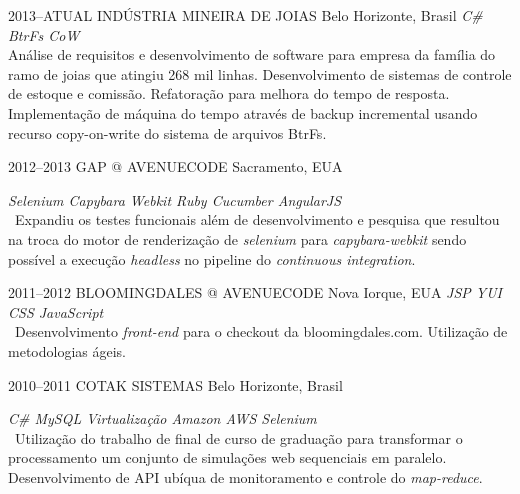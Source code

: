 \documentclass[]{friggeri-cv}
\begin{document}
\begin{entrylist}


\entry
{2013--ATUAL}
{INDÚSTRIA MINEIRA DE JOIAS}
{Belo Horizonte, Brasil}
{\emph{\bullet C\# \bullet BtrFs CoW  } \\ Análise de requisitos e desenvolvimento de software para empresa da família do ramo de joias que atingiu 268 mil linhas. Desenvolvimento de sistemas de controle de estoque e comissão. Refatoração para melhora do tempo de resposta. Implementação de máquina do tempo através de backup incremental usando recurso copy-on-write do sistema de arquivos BtrFs. }


\entry
{2012--2013}
{GAP @ AVENUECODE}
{Sacramento, EUA}
{\emph{\bullet Selenium \bullet Capybara \bullet Webkit \bullet Ruby \bullet Cucumber \bullet AngularJS } \\
\
Expandiu os testes funcionais além de desenvolvimento e pesquisa que resultou na troca do motor de renderização de \textit{selenium} para \textit{capybara-webkit} sendo possível a execução \textit{headless} no pipeline do \textit{continuous integration}.%

}


\entry
{2011--2012}
{BLOOMINGDALES @ AVENUECODE}
{Nova Iorque, EUA}
{\emph{\bullet JSP \bullet YUI \bullet CSS \bullet JavaScript } \\
\
Desenvolvimento \textit{front-end} para o checkout da bloomingdales.com. Utilização de metodologias ágeis.
}

\entry
{2010--2011}
{COTAK SISTEMAS}
{Belo Horizonte, Brasil}
{\emph{\bullet C\# \bullet MySQL \bullet Virtualização \bullet Amazon AWS \bullet Selenium } \\
\
Utilização do trabalho de final de curso de graduação para transformar o processamento um conjunto de simulações web sequenciais em paralelo. Desenvolvimento de API ubíqua de monitoramento e controle do \textit{map-reduce}.

}




\end{entrylist}
\end{document}
